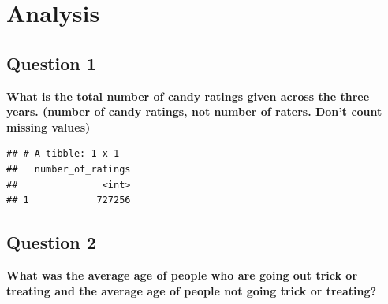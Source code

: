 \documentclass[]{article}
\newenvironment{Shaded}{\begin{snugshade}}{\end{snugshade}}
\newcommand{\CommentTok}[1]{\textcolor[rgb]{0.56,0.35,0.01}{\textit{#1}}}
\newcommand{\DataTypeTok}[1]{\textcolor[rgb]{0.13,0.29,0.53}{#1}}
\newcommand{\KeywordTok}[1]{\textcolor[rgb]{0.13,0.29,0.53}{\textbf{#1}}}
\newcommand{\NormalTok}[1]{#1}
\newcommand{\OperatorTok}[1]{\textcolor[rgb]{0.81,0.36,0.00}{\textbf{#1}}}
\newcommand{\StringTok}[1]{\textcolor[rgb]{0.31,0.60,0.02}{#1}}
\begin{document}
\hypertarget{analysis}{%
\section{Analysis}\label{analysis}}

\hypertarget{question-1}{%
\subsection{Question 1}\label{question-1}}

\textbf{What is the total number of candy ratings given across the three
years. (number of candy ratings, not number of raters. Don't count
missing values)}

\begin{Shaded}
\end{Shaded}

\begin{verbatim}
## # A tibble: 1 x 1
##   number_of_ratings
##               <int>
## 1            727256
\end{verbatim}

\hypertarget{question-2}{%
\subsection{Question 2}\label{question-2}}

\textbf{What was the average age of people who are going out trick or
treating and the average age of people not going trick or treating?}

\begin{Shaded}
\end{Shaded}
\end{document}
